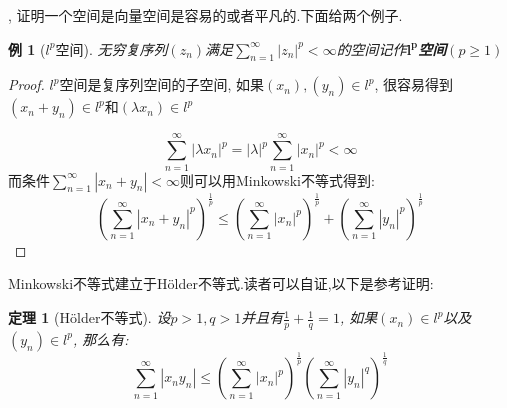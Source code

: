 \documentclass[a4paper,11pt]{article}
\newtheorem{theorem}{\hspace{2em}定理}[section]
\newtheorem{proof}{证明}[section]
\newtheorem{example}{例}[section]
\begin{document}
, 证明一个空间是向量空间是容易的或者平凡的.下面给两个例子.
\begin{example}[$l^p$空间]
  无穷复序列$(z_n)$满足$\sum_{n=1}^{\infty}|z_n|^p<\infty$的空间记作\textbf{$\mathbf{l^p}$空间}$(p\geq1)$
\end{example}
\begin{proof}
  \indent$l^p$空间是复序列空间的子空间, 如果$(x_n),(y_n)\in l^p$, 很容易得到$(x_n+y_n)\in l^p$和$(\lambda x_n)\in l^p$

  \begin{equation*}
    \sum_{n=1}^\infty|\lambda x_n|^p=|\lambda|^p\sum_{n=1}^{\infty}|x_n|^p<\infty
  \end{equation*}
而条件$\sum_{n=1}^{\infty}|x_n+y_n|<\infty$则可以用Minkowski不等式得到:
\begin{equation*}
  (\sum_{n=1}^{\infty}|x_n+y_n|^p)^{\frac{1}{p}}\leq(\sum_{n=1}^{\infty}|x_n|^p)^{\frac{1}{p}}+(\sum_{n=1}^{\infty}|y_n|^p)^{\frac{1}{p}}
\end{equation*}
\end{proof}
Minkowski不等式建立于H\"{o}lder不等式.读者可以自证,以下是参考证明:
\begin{theorem}[H\"{o}lder不等式]
  设$p>1,q>1$并且有$\frac{1}{p}+\frac{1}{q}=1$, 如果$(x_n)\in l^p$以及$(y_n)\in l^p$, 那么有:
  \begin{equation*}
    \sum_{n=1}^{\infty}|x_ny_n|\leq(\sum_{n=1}^{\infty}|x_n|^p)^{\frac{1}{p}}(\sum_{n=1}^{\infty}|y_n|^q)^{\frac{1}{q}}
  \end{equation*}
\end{theorem}
\end{document}

